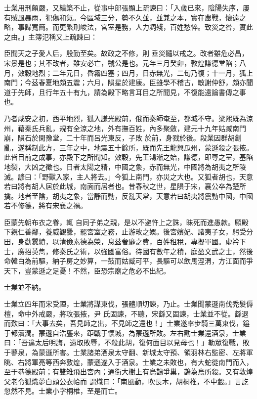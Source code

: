 \begin{pinyinscope}
 士業用刑頗嚴，又繕築不止，從事中郎張顯上疏諫曰：「入歲已來，陰陽失序，屢有賊風暴雨，犯傷和氣。今區域三分，勢不久並，並兼之本，實在農戰，懷遠之略，事歸寬簡。而更繁刑峻法，宮室是務，人力凋殘，百姓愁悴。致災之咎，實此之由。」主簿氾稱又上疏諫曰：



 臣聞天之子愛人后，殷勤至矣。故政之不修，則
 垂災譴以戒之。改者雖危必昌，宋景是也；其不改者，雖安必亡，虢公是也。元年三月癸卯，敦煌謙德堂陷；八月，效穀地烈；二年元日，昏霧四塞；四月，日赤無光，二旬乃復；十一月，狐上南門；今茲春夏地頗五震；六月，隕星於建康。臣雖學不稽古，敏謝仲舒，頗亦聞道于先師，且行年五十有九，請為殿下略言耳目之所聞見，不復能遠論書傳之事也。



 乃者咸安之初，西平地烈，狐入謙光殿前，俄而秦師奄至，都城不守。梁熙既為涼州，藉秦氏兵亂，規有全涼之地，外有撫百姓，內多聚斂，建元十九年姑臧南門崩，隕石於閑豫堂，二十年而呂光東反，子敗
 於前，身戮於後。段業因群胡創亂，遂稱制此方，三年之中，地震五十餘所，既而先王龍興瓜州，蒙遜殺之張掖。此皆目前之成事，亦殿下之所聞知。效穀，先王鴻漸之始，謙德，即尊之室，基陷地裂，大凶之徵也。日者太陽之精，中國之象，赤而無光，中國將為胡夷之所陵滅。諺曰：「野獸入家，主人將去。」今狐上南門，亦災之大也。又狐者胡也，天意若曰將有胡人居於此城，南面而居者也。昔春秋之世，星隕于宋，襄公卒為楚所擒。地者至陰，胡夷之象，當靜而動，反亂天常，天意若曰胡夷將震動中國，中國若不修德，將有宋襄之禍。



 臣蒙先朝布衣之眷，輒
 自同子弟之親，是以不避忤上之誅，昧死而進愚款。願殿下親仁善鄰，養威觀釁，罷宮室之務，止游畋之娛。後宮嬪妃、諸夷子女，躬受分田，身勸蠶績，以清儉素德為榮，息茲奢靡之費，百姓租稅，專擬軍國。虛衿下士，廣招英雋，修秦氏之術，以強國富俗。待國有數年之積，庭盈文武之士，然後命韓白為前驅，納子房之妙算，一鼓而姑臧可平，長驅可以飲馬涇渭，方江面而爭天下，豈蒙遜之足憂！不然，臣恐宗廟之危必不出紀。



 士業並不納。



 士業立四年而宋受禪，士業將謀東伐，張體順切諫，乃止。士業聞蒙遜南伐禿髮傉檀，命中外戒嚴，將攻張掖，尹
 氏固諫，不聽，宋繇又固諫，士業並不從。繇退而歎曰：「大事去矣，吾見師之出，不見師之還也！」士業遂率步騎三萬東伐，鎰于都瀆澗。蒙遜自浩亹來，距戰于懷城，為蒙遜所敗。左右勸士業還酒泉，士業曰：「吾違太后明誨，遠取敗辱，不殺此胡，復何面目以見母也！」勒眾復戰，敗于蓼泉，為蒙遜所害。士業諸弟酒泉太守翻、新城太守預、領羽林右監密、左將軍眺、右將軍亮等西奔敦煌，蒙遜遂入于酒泉。士業之未敗也，有大蛇從南門而入，至于恭德殿前；有雙雉飛出宮內；通街大樹上有烏鵲爭巢，鵲為烏所殺。又有敦煌父老令狐熾夢白頭公衣帢而
 謂熾曰：「南風動，吹長木，胡桐椎，不中轂。」言訖忽然不見。士業小字桐椎，至是而亡。




\end{pinyinscope}
